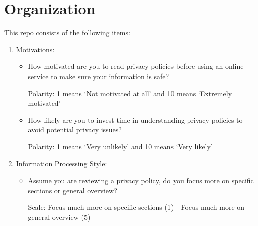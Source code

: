 \section{Organization}


This repo consists of the following items:
\begin{enumerate}
\item Motivations:
    \begin{itemize}
        \item How motivated are you to read privacy policies before using an online service to make sure your information is safe?	

        Polarity: 1 means ‘Not motivated at all’ and 10 means ‘Extremely motivated’
        
        \item How likely are you to invest time in understanding privacy policies to avoid potential privacy issues?
        
        Polarity: 1 means ‘Very unlikely’ and 10 means ‘Very likely’

    \end{itemize}
\item Information Processing Style:
    \begin{itemize}



        
        \item Assume you are reviewing a privacy policy, do you focus more on specific sections or general overview?

        Scale: Focus much more on specific sections (1) - Focus much more on general overview (5)


\end{itemize}
\end{enumerate}
